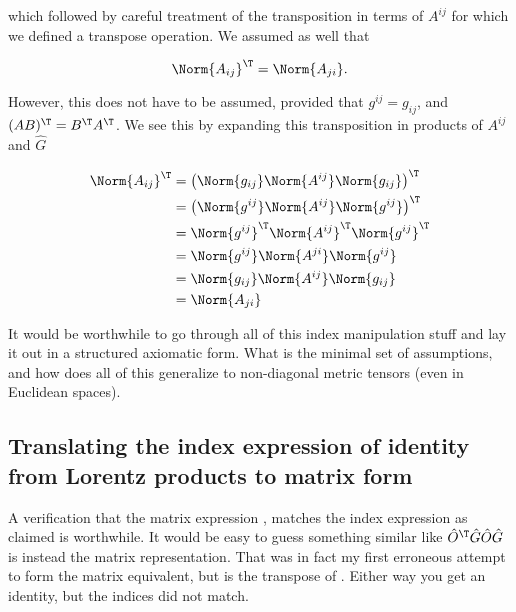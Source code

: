 which followed by careful treatment of the transposition in terms of $A^{i j}$ for which we defined a transpose operation.  We assumed as well that

\begin{equation}\label{eqn:relativisticElectrodynamicsL11:1042}
\Norm{ A_{i j} }^\T = \Norm{ A_{j i} }.
\end{equation}

However, this does not have to be assumed, provided that $g^{i j} = g_{i j}$, and $(AB)^\T = B^\T A^\T$.  We see this by expanding this transposition in products of $A^{i j}$ and $\hat{G}$

\begin{equation}\label{eqn:relativisticElectrodynamicsL11b:1480}
\begin{aligned}
\Norm{ A_{i j} }^\T
&= \left( \Norm{g_{i j}} \Norm{ A^{i j} } \Norm{g_{i j}} \right)^\T \\
&= \left( \Norm{g^{i j}} \Norm{ A^{i j} } \Norm{g^{i j}} \right)^\T \\
&= \Norm{g^{i j}}^\T \Norm{ A^{i j}}^\T \Norm{g^{i j}}^\T \\
&= \Norm{g^{i j}} \Norm{ A^{j i}} \Norm{g^{i j}} \\
&= \Norm{g_{i j}} \Norm{ A^{i j}} \Norm{g_{i j}} \\
&= \Norm{ A_{j i}} 
\end{aligned}
\end{equation}

It would be worthwhile to go through all of this index manipulation stuff and lay it out in a structured axiomatic form.  What is the minimal set of assumptions, and how does all of this generalize to non-diagonal metric tensors (even in Euclidean spaces).

\subsection{Translating the index expression of identity from Lorentz products to matrix form}

A verification that the matrix expression , matches the index expression  as claimed is worthwhile.  It would be easy to guess something similar like $\hat{O}^\T \hat{G} \hat{O} \hat{G}$ is instead the matrix representation.  That was in fact my first erroneous attempt to form the matrix equivalent, but is the transpose of .  Either way you get an identity, but the indices did not match.

